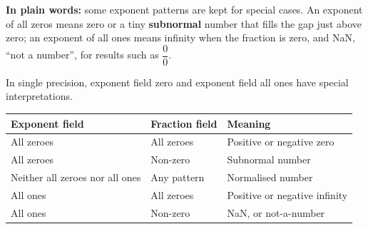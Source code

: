 \documentclass[11pt]{article}
\begin{document}
\begin{keepsection}
\begin{center}
\begin{minipage}[t]{0.303\linewidth}\centering
{}\par{}\end{minipage}
\end{center}

\begin{plainbox}\textbf{In plain words:} some exponent patterns are kept for special cases. An exponent of all zeros means zero or a tiny \textbf{subnormal} number that fills the gap just above zero; an exponent of all ones means infinity when the fraction is zero, and NaN, “not a number”, for results such as {\small\ensuremath{\dfrac{0}{0}}}.\end{plainbox}

In single precision, exponent field zero and exponent field all ones have special interpretations.

\begin{center}\small\begin{tabularx}{\linewidth}{>{\raggedright\arraybackslash}X>{\raggedright\arraybackslash}X>{\raggedright\arraybackslash}X}\toprule
\textbf{Exponent field} & \textbf{Fraction field} & \textbf{Meaning} \\ \midrule
All zeroes & All zeroes & Positive or negative zero \\
All zeroes & Non-zero & Subnormal number \\
Neither all zeroes nor all ones & Any pattern & Normalised number \\
All ones & All zeroes & Positive or negative infinity \\
All ones & Non-zero & NaN, or not-a-number \\
\bottomrule\end{tabularx}\end{center}


\end{keepsection}
\end{document}
